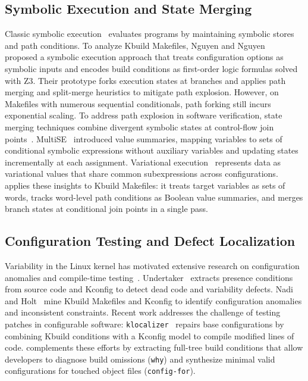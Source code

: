 \documentclass[acmsmall,screen,review,anonymous,nonacm]{acmart}
\begin{document}
  \subsection{Symbolic Execution and State Merging}
    \label{sec:related:symex}
    Classic symbolic execution~\cite{king1976symbolic,cadar2008klee,godefroid2005dart} evaluates programs by maintaining symbolic stores and path conditions.
    To analyze Kbuild Makefiles, Nguyen and Nguyen~\cite{nguyen2020kbuild} proposed a symbolic execution approach that treats configuration options as symbolic inputs and encodes build conditions as first-order logic formulas solved with Z3.
    Their prototype forks execution states at branches and applies path merging and split-merge heuristics to mitigate path explosion.
    However, on Makefiles with numerous sequential conditionals, path forking still incurs exponential scaling.
    To address path explosion in software verification, state merging techniques combine divergent symbolic states at control-flow join points~\cite{kuznetsov2012efficient,avgerinos2014enhancing}.
    MultiSE~\cite{sen2015multise} introduced value summaries, mapping variables to sets of conditional symbolic expressions without auxiliary variables and updating states incrementally at each assignment.
    Variational execution~\cite{walkingshaw2014variational,liebig2011variability} represents data as variational values that share common subexpressions across configurations.
    \tool{} applies these insights to Kbuild Makefiles: it treats target variables as sets of words, tracks word-level path conditions as Boolean value summaries, and merges branch states at conditional join points in a single pass.

  \subsection{Configuration Testing and Defect Localization}
    \label{sec:related:config}
    Variability in the Linux kernel has motivated extensive research on configuration anomalies and compile-time testing~\cite{tartler2011dead,nadi2014mining,passos2013coevolution}.
    Undertaker~\cite{tartler2011dead} extracts presence conditions from source code and Kconfig to detect dead code and variability defects.
    Nadi and Holt~\cite{nadi2014mining} mine Kbuild Makefiles and Kconfig to identify configuration anomalies and inconsistent constraints.
    Recent work addresses the challenge of testing patches in configurable software:
    \texttt{klocalizer}~\cite{yildiran2024krepair} repairs base configurations by combining Kbuild conditions with a Kconfig model to compile modified lines of code.
    \tool{} complements these efforts by extracting full-tree build conditions that allow developers to diagnose build omissions (\texttt{why}) and synthesize minimal valid configurations for touched object files (\texttt{config-for}).
\end{document}
